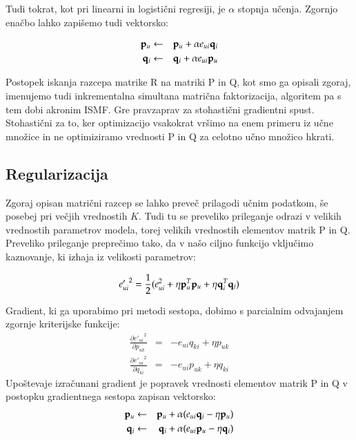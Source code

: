 Tudi tokrat, kot pri linearni in logistični regresiji, je $\alpha$ stopnja učenja. Zgornjo enačbo lahko zapišemo tudi vektorsko:

\begin{eqnarray}
  {\bf p}_{u} & \leftarrow & {\bf p}_{u} + \alpha e_{ui} {\bf q}_{i} \\
  {\bf q}_{i} & \leftarrow & {\bf q}_{i} + \alpha e_{ui} {\bf p}_{u} \nonumber
\end{eqnarray}

Postopek iskanja razcepa matrike R na matriki P in Q, kot smo ga opisali zgoraj, imenujemo tudi inkrementalna simultana matrična faktorizacija, algoritem pa s tem dobi akronim ISMF. Gre pravzaprav za stohastični gradientni spust. Stohastični za to, ker optimizacijo vsakokrat vršimo na enem primeru iz učne množice in ne optimiziramo vrednosti P in Q za celotno učno množico hkrati.

\subsection{Regularizacija}

Zgoraj opisan matrični razcep se lahko preveč prilagodi učnim podatkom, še posebej pri večjih vrednostih $K$. Tudi tu se preveliko prileganje odrazi v velikih vrednostih parametrov modela, torej velikih vrednostih elementov matrik P in Q. Preveliko prileganje preprečimo tako, da v našo ciljno funkcijo vključimo kaznovanje, ki izhaja iz velikosti parametrov:

\begin{equation}
{e'_{ui}}^2 = {1\over 2}(e_{ui}^2 + \eta {\bf p}_u^T {\bf p}_u + \eta {\bf q}_i^T {\bf q}_i)
\end{equation}

Gradient, ki ga uporabimo pri metodi sestopa, dobimo s parcialnim odvajanjem zgornje kriterijske funkcije:
%
\begin{eqnarray}\label{e:grad-fact-reg}
  \frac{\partial {e'_{ui}}^2}{\partial p_{uk}} & = & -e_{ui}q_{ki} + \eta p_{uk} \\
  \frac{\partial {e'_{ui}}^2}{\partial q_{ki}} & = & -e_{ui}p_{uk} + \eta q_{ki} \nonumber
\end{eqnarray}
%
Upoštevaje izračunani gradient je popravek vrednosti elementov matrik P in Q v postopku gradientnega sestopa zapisan vektorsko:
%
\begin{eqnarray}\label{e:grad-descent-reg}
  {\bf p}_{u} & \leftarrow & {\bf p}_{u} + \alpha (e_{ui} {\bf q}_{i} - \eta {\bf p}_{u})\\
  {\bf q}_{i} & \leftarrow & {\bf q}_{i} + \alpha (e_{ui} {\bf p}_{u} - \eta {\bf q}_{i}) \nonumber  
\end{eqnarray}

